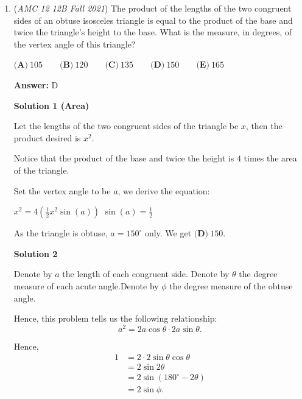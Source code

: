 \begin{enumerate}
\textbf{Solution 5 (Logic and some Guesswork)}

We know that $x$, $y$, and $z$ are symmetric, which means that answer choices B and C are the same, so it can't be either of them. Answer choice E doesn't make sense because it is only 1 equation, which probably won't result in only 1 possible answer. This leaves us with choices A and D. Choice A isn't right because if $x$ is really big and $y=z=0$, then the equation becomes $x^2-x=1$ which doesn't work with a large integer $x$. Therefore, the only remaining answer choice is $\boxed{D}$

 \textit{ ~Education, the Study of Everything }

 


	\item (\textit{AMC 12 12B Fall 2021}) The product of the lengths of the two congruent sides of an obtuse isosceles triangle is equal to the product of the base and twice the triangle's height to the base. What is the measure, in degrees, of the vertex angle of this triangle?


 $\textbf{(A)} \: 105 \qquad\textbf{(B)} \: 120 \qquad\textbf{(C)} \: 135 \qquad\textbf{(D)} \: 150 \qquad\textbf{(E)} \: 165$

 \textbf{Answer: }D



\textbf{Solution 1 (Area)}

Let the lengths of the two congruent sides of the triangle be $x$, then the product desired is $x^2$.

 Notice that the product of the base and twice the height is $4$ times the area of the triangle.

 Set the vertex angle to be $a$, we derive the equation:

 $x^2=4\left(\frac{1}{2}x^2\sin(a)\right)$
$\sin(a)=\frac{1}{2}$

 As the triangle is obtuse, $a=150^\circ$ only. We get $\boxed{\textbf{(D)} \ 150}.$




\textbf{Solution 2}

Denote by $a$ the length of each congruent side. Denote by $\theta$ the degree measure of each acute angle.Denote by $\phi$ the degree measure of the obtuse angle.

 Hence, this problem tells us the following relationship:
 \[ a^2 = 2 a \cos \theta \cdot 2 a \sin \theta . \]

 Hence,
 \begin{align*} 1 & = 2 \cdot 2 \sin \theta \cos \theta \\ & = 2 \sin 2 \theta \\ & = 2 \sin \left( 180^\circ - 2 \theta \right) \\ & = 2 \sin \phi . \end{align*}



\end{enumerate}
